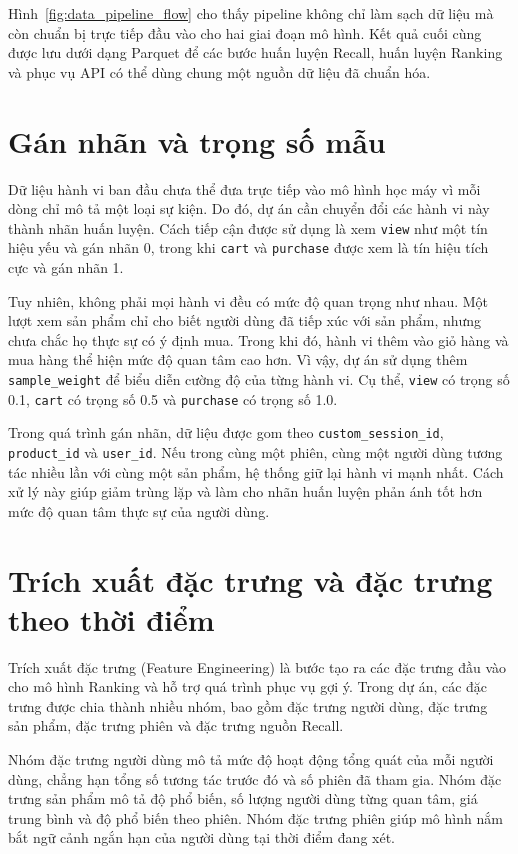Hình~\ref{fig:data_pipeline_flow} cho thấy pipeline không chỉ làm sạch dữ liệu mà còn chuẩn bị trực tiếp đầu vào cho hai giai đoạn mô hình. Kết quả cuối cùng được lưu dưới dạng Parquet để các bước huấn luyện Recall, huấn luyện Ranking và phục vụ API có thể dùng chung một nguồn dữ liệu đã chuẩn hóa.

\section{Gán nhãn và trọng số mẫu}
Dữ liệu hành vi ban đầu chưa thể đưa trực tiếp vào mô hình học máy vì mỗi dòng chỉ mô tả một loại sự kiện. Do đó, dự án cần chuyển đổi các hành vi này thành nhãn huấn luyện. Cách tiếp cận được sử dụng là xem \colorbox{gray!15}{\texttt{view}} như một tín hiệu yếu và gán nhãn 0, trong khi \colorbox{gray!15}{\texttt{cart}} và \colorbox{gray!15}{\texttt{purchase}} được xem là tín hiệu tích cực và gán nhãn 1.
\medskip

Tuy nhiên, không phải mọi hành vi đều có mức độ quan trọng như nhau. Một lượt xem sản phẩm chỉ cho biết người dùng đã tiếp xúc với sản phẩm, nhưng chưa chắc họ thực sự có ý định mua. Trong khi đó, hành vi thêm vào giỏ hàng và mua hàng thể hiện mức độ quan tâm cao hơn. Vì vậy, dự án sử dụng thêm \texttt{sample\_weight} để biểu diễn cường độ của từng hành vi. Cụ thể, \colorbox{gray!15}{\texttt{view}} có trọng số 0.1, \colorbox{gray!15}{\texttt{cart}} có trọng số 0.5 và \colorbox{gray!15}{\texttt{purchase}} có trọng số 1.0.
\medskip

Trong quá trình gán nhãn, dữ liệu được gom theo \texttt{custom\_session\_id}, \texttt{product\_id} và \texttt{user\_id}. Nếu trong cùng một phiên, cùng một người dùng tương tác nhiều lần với cùng một sản phẩm, hệ thống giữ lại hành vi mạnh nhất. Cách xử lý này giúp giảm trùng lặp và làm cho nhãn huấn luyện phản ánh tốt hơn mức độ quan tâm thực sự của người dùng.

\section{Trích xuất đặc trưng và đặc trưng theo thời điểm}
Trích xuất đặc trưng (Feature Engineering) là bước tạo ra các đặc trưng đầu vào cho mô hình Ranking và hỗ trợ quá trình phục vụ gợi ý. Trong dự án, các đặc trưng được chia thành nhiều nhóm, bao gồm đặc trưng người dùng, đặc trưng sản phẩm, đặc trưng phiên và đặc trưng nguồn Recall.
\medskip

Nhóm đặc trưng người dùng mô tả mức độ hoạt động tổng quát của mỗi người dùng, chẳng hạn tổng số tương tác trước đó và số phiên đã tham gia. Nhóm đặc trưng sản phẩm mô tả độ phổ biến, số lượng người dùng từng quan tâm, giá trung bình và độ phổ biến theo phiên. Nhóm đặc trưng phiên giúp mô hình nắm bắt ngữ cảnh ngắn hạn của người dùng tại thời điểm đang xét.
\medskip

